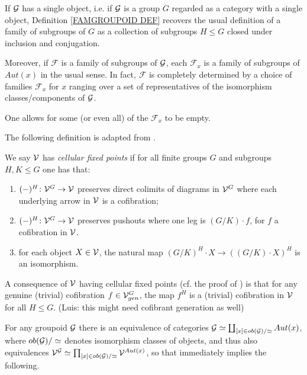 \documentclass[a4paper,10pt
,draft
]{article}%
\renewcommand{\F}{\mathcal F}
\renewcommand{\1}{\eta}%
\begin{document}
\begin{remark}
If $\mathcal{G}$ has a single object, i.e. if $\mathcal{G}$ is a group $G$ regarded as a category with a single object, Definition \ref{FAMGROUPOID DEF} recovers the usual definition of a family of subgroups of $G$ as a collection of subgroups $H\leq G$ closed under inclusion and conjugation.

Moreover, if $\F$ is a family of subgroups of $\mathcal{G}$, each $\F_x$ is a family of subgroups of $Aut(x)$ in the usual sense. 
In fact, $\mathcal{F}$ is completely determined by a choice of families
$\F_x$ for $x$ ranging over a set of representatives of the isomorphism classes/components of $\mathcal{G}$.
\end{remark}


\begin{remark}
One allows for some (or even all) of the $\F_x$ to be empty.
\end{remark}



The following definition is adapted from \cite{Ste16}.

\begin{definition}\label{CELLFP_DEF}
We say $\mathcal V$ has \textit{cellular fixed points} if
for all finite groups $G$ and subgroups $H, K \leq G$ one has that:
	\begin{enumerate}[label = (\roman*)]
	\item $(-)^H \colon \mathcal V^G \to \mathcal V$ preserves direct colimits of diagrams in $\mathcal V^G$ where each underlying arrow in $\mathcal V$ is a cofibration;
      \item $(-)^H \colon \mathcal V^G \to \mathcal V$ preserves pushouts where one leg is $(G/K) \cdot f$, for $f$ a cofibration in $\mathcal V$.
      \item for each object $X \in \mathcal V$, the natural map $(G/K)^H \cdot X \to ((G/K) \cdot X)^H$ is an isomorphism.
      \end{enumerate}
\end{definition}


\begin{remark}\label{LEVEL_COF_REM}
	A consequence of $\mathcal V$ having cellular fixed points (cf. the proof of \cite[Prop. 6.3(i)]{BP_geo})
	is that for any genuine (trivial) cofibration $f \in \mathcal V^G_{gen}$,
	the map $f^H$ is a (trivial) cofibration in $\mathcal V$ for all $H \leq G$.
	{\color{blue} (Luis: this might need cofibrant generation as well)}
\end{remark}



For any groupoid $\mathcal{G}$ there is an equivalence of categories
$\mathcal{G} \simeq \coprod_{[x] \in ob(\mathcal{G})/\simeq} Aut(x)$,
where $ob(\mathcal{G})/\simeq$
denotes isomorphism classes of objects,
and thus also equivalences
$\mathcal V^{\mathcal{G}} \simeq \prod_{[x] \in ob(\mathcal{G})/\simeq} \mathcal V^{Aut(x)}$,
so that \cite[Thm. 2.10]{Ste16}
immediately implies the following.
\end{document}

